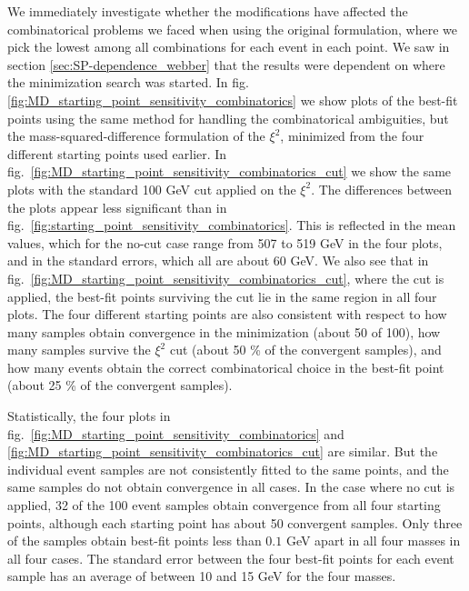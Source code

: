 \documentclass[twoside,english]{uiofysmaster}
\begin{document}
We immediately investigate whether the modifications have affected the combinatorical problems we faced when using the original formulation, where we pick the lowest among all combinations for each event in each point. We saw in section \ref{sec:SP-dependence_webber} that the results were dependent on where the minimization search was started. In fig. \ref{fig:MD_starting_point_sensitivity_combinatorics} we show plots of the best-fit points using the same method for handling the combinatorical ambiguities, but the mass-squared-difference formulation of the $\xi^2$, minimized from the four different starting points used earlier. In fig.\ \ref{fig:MD_starting_point_sensitivity_combinatorics_cut} we show the same plots with the standard 100 GeV cut applied on the $\xi^2$. The differences between the plots appear less significant than in fig.\ \ref{fig:starting_point_sensitivity_combinatorics}. This is reflected in the mean values, which for the no-cut case range from 507 to 519 GeV in the four plots, and in the standard errors, which all are about 60 GeV. We also see that in fig.\ \ref{fig:MD_starting_point_sensitivity_combinatorics_cut}, where the cut is applied, the best-fit points surviving the cut lie in the same region in all four plots. The four different starting points are also consistent with respect to how many samples obtain convergence in the minimization (about 50 of 100), how many samples survive the $\xi^2$ cut (about 50 \% of the convergent samples), and how many events obtain the correct combinatorical choice in the best-fit point (about 25 \% of the convergent samples). 

Statistically, the four plots in fig.\ \ref{fig:MD_starting_point_sensitivity_combinatorics} and \ref{fig:MD_starting_point_sensitivity_combinatorics_cut} are similar. But the individual event samples are not consistently fitted to the same points, and the same samples do not obtain convergence in all cases. In the case where no cut is applied, 32 of the 100 event samples obtain convergence from all four starting points, although each starting point has about 50 convergent samples. Only three of the samples obtain best-fit points less than $0.1$ GeV apart in all four masses in all four cases. The standard error between the four best-fit points for each event sample has an average of between 10 and 15 GeV for the four masses.
\end{document}
